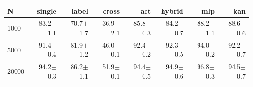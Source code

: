 \begin{tabular}{@{}lrrrrrrr@{}}\toprule
N & single & label & cross & act & hybrid & mlp & kan\\\midrule
1000 & 83.2$\pm$1.1 & 70.7$\pm$1.7 & 36.9$\pm$2.1 & 85.8$\pm$0.3 & 84.2$\pm$0.7 & 88.2$\pm$1.1 & 88.6$\pm$0.6\\
5000 & 91.4$\pm$0.4 & 81.9$\pm$1.2 & 46.0$\pm$0.1 & 92.4$\pm$0.2 & 92.3$\pm$0.5 & 94.0$\pm$0.2 & 92.2$\pm$0.7\\
20000 & 94.2$\pm$0.3 & 86.2$\pm$1.1 & 51.9$\pm$0.1 & 94.4$\pm$0.5 & 94.9$\pm$0.6 & 96.8$\pm$0.3 & 94.5$\pm$0.7\\
\bottomrule\end{tabular}